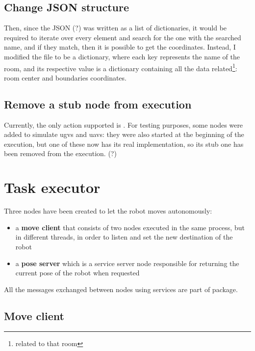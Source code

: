 \subsection*{Change JSON structure}

Then, since the JSON (?) was written as a list of dictionaries, it would be required to iterate over every element and search for the one with the searched name, and if they match, then it is possible to get the coordinates. Instead, I modified the file to be a dictionary, where each key represents the name of the room, and its respective value is a dictionary containing all the data related\footnote{related to that room}: room center and boundaries coordinates.

\subsection*{Remove a stub node from execution}

Currently, the only action supported is .
For testing purposes, some nodes were added to simulate \Acrshort{ugv}s and \Acrshort{uav}s: they were also started at the beginning of the execution, but one of these now has its real implementation, so its stub one has been removed from the execution. (?)

\section{Task executor}

Three nodes have been created to let the robot moves autonomously: 
\begin{itemize}
    \item a {\bf move client} that consists of two nodes executed in the same process, but in different threads, in order to listen and set the new destination of the robot
    \item a {\bf pose server} which is a service server node responsible for returning the current pose of the robot when requested
\end{itemize}

All the messages exchanged between nodes using services are part of  package. %

\subsection{Move client} %

